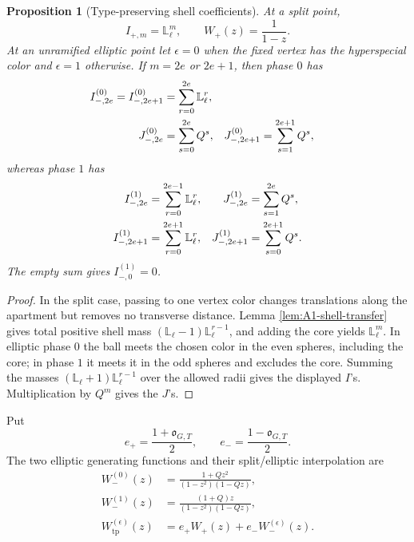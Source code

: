 \documentclass[11pt]{article}
\newtheorem{proposition}[theorem]{Proposition}
\theoremstyle{definition}
\theoremstyle{remark}
\newcommand{\Lell}{\mathbb L_{\ell}}
\begin{document}
\begin{proposition}[Type-preserving shell coefficients]
\label{prop:SL2-parity-coefficients}
At a split point,
\begin{equation}
 I_{+,m}=\Lell^m,\qquad W_+(z)=\frac1{1-z}.
 \label{eq:SL2-split-series}
\end{equation}
At an unramified elliptic point let $\epsilon=0$ when the fixed vertex has
the hyperspecial color and $\epsilon=1$ otherwise.  If $m=2e$ or $2e+1$,
then phase $0$ has
\begin{align}
 I_{-,2e}^{(0)}=I_{-,2e+1}^{(0)}
 &=\sum_{r=0}^{2e}\Lell^r,\notag\\
 J_{-,2e}^{(0)}&=\sum_{s=0}^{2e}Q^s,
 &J_{-,2e+1}^{(0)}&=\sum_{s=1}^{2e+1}Q^s,
 \label{eq:SL2-even-phase}
\end{align}
whereas phase $1$ has
\begin{align}
 I_{-,2e}^{(1)}&=\sum_{r=0}^{2e-1}\Lell^r,
 &J_{-,2e}^{(1)}&=\sum_{s=1}^{2e}Q^s,\notag\\
 I_{-,2e+1}^{(1)}&=\sum_{r=0}^{2e+1}\Lell^r,
 &J_{-,2e+1}^{(1)}&=\sum_{s=0}^{2e+1}Q^s.
 \label{eq:SL2-odd-phase}
\end{align}
The empty sum gives $I_{-,0}^{(1)}=0$.
\end{proposition}

\begin{proof}
In the split case, passing to one vertex color changes translations along
the apartment but removes no transverse distance.  Lemma
\ref{lem:A1-shell-transfer} gives total positive shell mass
$(\Lell-1)\Lell^{r-1}$, and adding the core yields $\Lell^m$.
In elliptic phase $0$ the ball meets the chosen color in the even spheres,
including the core; in phase $1$ it meets it in the odd spheres and excludes
the core.  Summing the masses
$(\Lell+1)\Lell^{r-1}$ over the allowed radii gives the displayed $I$'s.
Multiplication by $Q^m$ gives the $J$'s.
\end{proof}

Put
\[
 e_+=\frac{1+\mathfrak o_{G,T}}2,
 \qquad e_-=\frac{1-\mathfrak o_{G,T}}2.
\]
The two elliptic generating functions and their split/elliptic interpolation
are
\begin{align}
 W_-^{(0)}(z)&=\frac{1+Qz^2}{(1-z^2)(1-Qz)},
 \label{eq:SL2-even-series}\\
 W_-^{(1)}(z)&=\frac{(1+Q)z}{(1-z^2)(1-Qz)},
 \label{eq:SL2-odd-series}\\
 W_{\mathrm{tp}}^{(\epsilon)}(z)
 &=e_+W_+(z)+e_-W_-^{(\epsilon)}(z).
 \label{eq:SL2-type-preserving-series}
\end{align}
\end{document}
